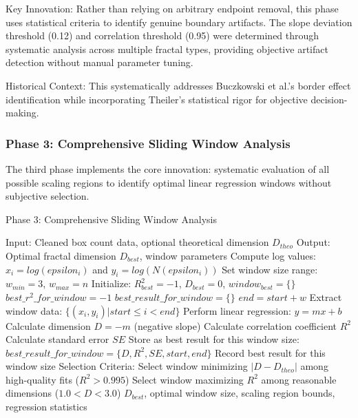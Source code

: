 \documentclass[preprint,12pt]{elsarticle}
\def\textbf#1{#1}%
\def\log{log}%
\def\epsilon{epsilon}%
\begin{document}
\textbf{Key Innovation}: Rather than relying on arbitrary endpoint removal, this phase uses statistical criteria to identify genuine boundary artifacts. The slope deviation threshold (0.12) and correlation threshold (0.95) were determined through systematic analysis across multiple fractal types, providing objective artifact detection without manual parameter tuning.

\textbf{Historical Context}: This systematically addresses Buczkowski et al.'s border effect identification while incorporating Theiler's statistical rigor for objective decision-making.

\subsubsection{Phase 3: Comprehensive Sliding Window Analysis}

The third phase implements the core innovation: systematic evaluation of all possible scaling regions to identify optimal linear regression windows without subjective selection.

\begin{algorithm}[H]
\caption{Phase 3: Comprehensive Sliding Window Analysis}
\begin{algorithmic}[1]
\small
\State \textbf{Input:} Cleaned box count data, optional theoretical dimension $D_{theo}$
\State \textbf{Output:} Optimal fractal dimension $D_{best}$, window parameters
\State
\State Compute log values: $x_i = \log(\epsilon_i)$ and $y_i = \log(N(\epsilon_i))$
\State Set window size range: $w_{min} = 3$, $w_{max} = n$
\State Initialize: $R^2_{best} = -1$, $D_{best} = 0$, $window_{best} = \{\}$
\State
{}
    \State $best\_r^2\_for\_window = -1$
    \State $best\_result\_for\_window = \{\}$
    \State
        \State $end = start + w$
        \State Extract window data: $\{(x_i, y_i) | start \leq i < end\}$
        \State
        \State Perform linear regression: $y = mx + b$
        \State Calculate dimension $D = -m$ (negative slope)
        \State Calculate correlation coefficient $R^2$
        \State Calculate standard error $SE$
        \State
            \State Store as best result for this window size:
            \State $best\_result\_for\_window = \{D, R^2, SE, start, end\}$
        \EndIf
    \EndFor
    \State
    \State Record best result for this window size
\EndFor
\State
\State \textbf{Selection Criteria:}
    \State Select window minimizing $|D - D_{theo}|$ among high-quality fits ($R^2 > 0.995$)
\Else
    \State Select window maximizing $R^2$ among reasonable dimensions ($1.0 < D < 3.0$)
\EndIf
\State
\State \Return $D_{best}$, optimal window size, scaling region bounds, regression statistics
\end{algorithmic}
\end{algorithm}
\end{document}
